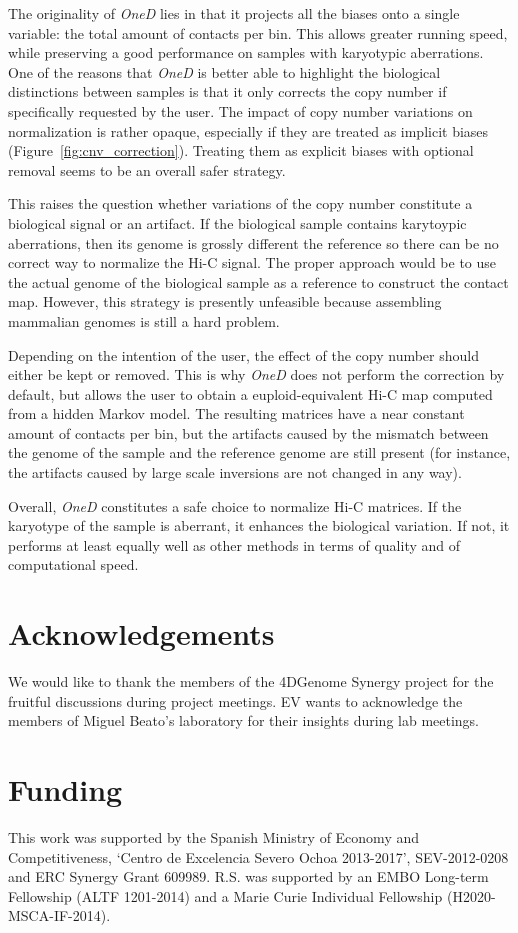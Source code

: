 \documentclass{bioinfo}
\begin{document}
The originality of \textit{OneD} lies in that it projects all the biases
onto a single variable: the total amount of contacts per bin. This allows
greater running speed, while preserving a good performance on samples with
karyotypic aberrations. One of the reasons that \textit{OneD} is better
able to highlight the biological distinctions between samples is that it
only corrects the copy number if specifically requested by the user. The
impact of copy number variations on normalization is rather opaque,
especially if they are treated as implicit biases
(Figure~\ref{fig:cnv_correction}). Treating them as explicit biases with
optional removal seems to be an overall safer strategy.

This raises the question whether variations of the copy number constitute
a biological signal or an artifact. If the biological sample contains
karytoypic aberrations, then its genome is grossly different the reference
so there can be no correct way to normalize the Hi-C signal. The proper
approach would be to use the actual genome of the biological sample as a
reference to construct the contact map. However, this strategy is
presently unfeasible because assembling mammalian genomes is still a hard
problem.

Depending on the intention of the user, the effect of the copy number
should either be kept or removed. This is why \textit{OneD} does not
perform the correction by default, but allows the user to obtain a
euploid-equivalent Hi-C map computed from a hidden Markov model. The
resulting matrices have a near constant amount of contacts per bin, but
the artifacts caused by the mismatch between the genome of the sample and
the reference genome are still present (for instance, the artifacts caused
by large scale inversions are not changed in any way).

Overall, \textit{OneD} constitutes a safe choice to normalize Hi-C
matrices. If the karyotype of the sample is aberrant, it enhances the
biological variation.  If not, it performs at least equally well as other
methods in terms of quality and of computational speed.


\section*{Acknowledgements}

We would like to thank the members of the 4DGenome Synergy project for the
fruitful discussions during project meetings. EV wants to acknowledge
the members of Miguel Beato's laboratory for their insights during lab
meetings.

\section*{Funding}

This work was supported by the Spanish Ministry of Economy and
Competitiveness, ‘Centro de Excelencia Severo Ochoa 2013-2017’,
SEV-2012-0208 and ERC Synergy Grant 609989. R.S. was supported by an EMBO Long-term
Fellowship (ALTF 1201-2014) and a Marie Curie Individual Fellowship (H2020-MSCA-IF-2014).

\vspace*{-12pt}



\end{document}
